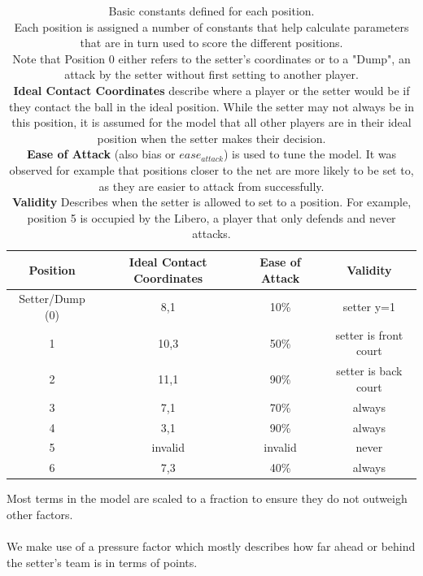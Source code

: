 \documentclass[main.tex]{subfiles}
\begin{document}
      \begin{table}[h!]
        \label{tab:positions}
        \centering
        \caption{Basic constants defined for each position. \\
          Each position is assigned a number of constants that help calculate parameters that are in turn used to score the different positions. \\
          Note that Position 0 either refers to the setter's coordinates or to a "Dump", an attack by the setter without first setting to another player. \\
          \textbf{Ideal Contact Coordinates} describe where a player or the setter would be if they contact the ball in the ideal position. While the setter may not always be in this position, it is assumed for the model that all other players are in their ideal position when the setter makes their decision. \\
          \textbf{Ease of Attack} (also bias or \(ease_{attack}\)) is used to tune the model. It was observed for example that positions closer to the net are more likely to be set to, as they are easier to attack from successfully. \\
          \textbf{Validity} Describes when the setter is allowed to set to a position. For example, position 5 is occupied by the Libero, a player that only defends and never attacks. 
          }
        \begin{tabular}{ c | c c c }
          \hline
          Position  & Ideal Contact Coordinates & Ease of Attack & Validity \\ \hline \hline
          Setter/Dump (0) &  8,1 & 10\% & setter y=1 \\
          1 & 10,3 & 50\% & setter is front court \\
          2 & 11,1 & 90\% & setter is back court \\
          3 & 7,1 & 70\% &  always \\
          4 & 3,1 & 90\% & always \\
          5 & invalid & invalid & never\\
          6 & 7,3 & 40\% & always \\
          \hline
        \end{tabular}
      \end{table}
      Most terms in the model are scaled to a fraction to ensure they do not outweigh other factors.
      \\\\
      We make use of a pressure factor which mostly describes how far ahead or behind the setter's team is in terms of points.
      
\end{document}
